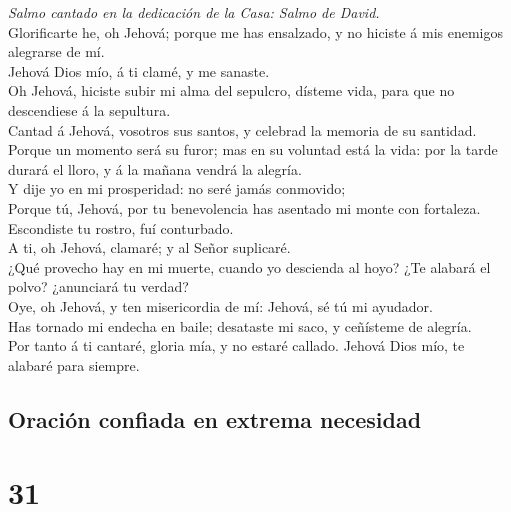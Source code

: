  \emph{Salmo cantado en la dedicación de la Casa: Salmo de
David.}\\
Glorificarte he, oh Jehová; porque me has ensalzado, y no hiciste á mis
enemigos alegrarse de mí.\\
 Jehová Dios mío, á ti clamé, y me sanaste.\\
 Oh Jehová, hiciste subir mi alma del sepulcro, dísteme
vida, para que no descendiese á la sepultura.\\
 Cantad á Jehová, vosotros sus santos, y celebrad la memoria
de su santidad.\\
 Porque un momento será su furor; mas en su voluntad está la
vida: por la tarde durará el lloro, y á la mañana vendrá la alegría.\\
 Y dije yo en mi prosperidad: no seré jamás conmovido;\\
 Porque tú, Jehová, por tu benevolencia has asentado mi
monte con fortaleza. Escondiste tu rostro, fuí conturbado.\\
 A ti, oh Jehová, clamaré; y al Señor suplicaré.\\
 ¿Qué provecho hay en mi muerte, cuando yo descienda al
hoyo? ¿Te alabará el polvo? ¿anunciará tu verdad?\\
 Oye, oh Jehová, y ten misericordia de mí: Jehová, sé tú mi
ayudador.\\
 Has tornado mi endecha en baile; desataste mi saco, y
ceñísteme de alegría.\\
 Por tanto á ti cantaré, gloria mía, y no estaré callado.
Jehová Dios mío, te alabaré para siempre.

\hypertarget{oraciuxf3n-confiada-en-extrema-necesidad}{%
\subsection{Oración confiada en extrema
necesidad}\label{oraciuxf3n-confiada-en-extrema-necesidad}}

\hypertarget{section-30}{%
\section{31}\label{section-30}}

